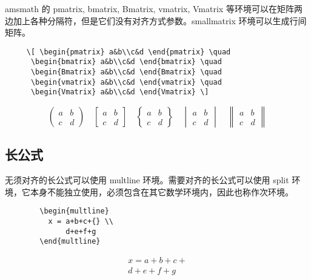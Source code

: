 \documentclass[a4paper]{article}
\newcommand\bpics[1]{\par\vspace{1ex}\noindent\begin{minipage}{\textwidth}\begin{minipage}{#1\textwidth}}
\newcommand\mpics[1]{\end{minipage}\begin{minipage}{#1\textwidth}\linespread{1}}
\newcommand\epics{\end{minipage}\end{minipage}\par\vspace{2ex}}
\begin{document}
   amsmath 的 pmatrix, bmatrix, Bmatrix, vmatrix, Vmatrix 等环境可以在矩阵两边加上各种分隔符，但是它们没有对齐方式参数。smallmatrix 环境可以生成行间矩阵。

   \begin{verbatim}
     \[ \begin{pmatrix} a&b\\c&d \end{pmatrix} \quad
      \begin{bmatrix} a&b\\c&d \end{bmatrix} \quad
      \begin{Bmatrix} a&b\\c&d \end{Bmatrix} \quad
      \begin{vmatrix} a&b\\c&d \end{vmatrix} \quad
      \begin{Vmatrix} a&b\\c&d \end{Vmatrix} \]
   \end{verbatim}
   \[ \begin{pmatrix} a&b\\c&d \end{pmatrix} \quad
      \begin{bmatrix} a&b\\c&d \end{bmatrix} \quad
      \begin{Bmatrix} a&b\\c&d \end{Bmatrix} \quad
      \begin{vmatrix} a&b\\c&d \end{vmatrix} \quad
      \begin{Vmatrix} a&b\\c&d \end{Vmatrix} \]

  \subsection{长公式}
    无须对齐的长公式可以使用 multline 环境。需要对齐的长公式可以使用 split 环境，它本身不能独立使用，必须包含在其它数学环境内，因此也称作次环境。

    \bpics{0.6}\begin{verbatim}
        \begin{multline}
          x = a+b+c+{} \\
              d+e+f+g
        \end{multline}\end{verbatim}
    \mpics{0.3}
        \begin{multline}
          x = a+b+c+{} \\
              d+e+f+g
        \end{multline}
    \epics
\end{document}
